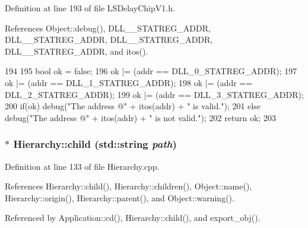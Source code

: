 Definition at line 193 of file LSDelayChipV1.h.

References Object::debug(), DLL\_\_\-STATREG\_\-ADDR, DLL\_\_\-STATREG\_\-ADDR, DLL\_\_\-STATREG\_\-ADDR, DLL\_\_\-STATREG\_\-ADDR, and itos().


\begin{DoxyCode}
194     {
195          bool ok = false;  
196          ok |= (addr == DLL_0_STATREG_ADDR); 
197          ok |= (addr == DLL_1_STATREG_ADDR);
198          ok |= (addr == DLL_2_STATREG_ADDR);
199          ok |= (addr == DLL_3_STATREG_ADDR);  
200          if(ok) debug("The address @" + itos(addr) + " is valid.");
201          else   debug("The address @" + itos(addr) + " is not valid.");      
202          return ok;           
203     }
\end{DoxyCode}
\hypertarget{classHierarchy_a1e207f973c694b538bf90107b4868817}{
\subsubsection[{child}]{ $\ast$ Hierarchy::child (std::string {\em path})}}
\label{classHierarchy_a1e207f973c694b538bf90107b4868817}


Definition at line 133 of file Hierarchy.cpp.

References Hierarchy::child(), Hierarchy::children(), Object::name(), Hierarchy::origin(), Hierarchy::parent(), and Object::warning().

Referenced by Application::cd(), Hierarchy::child(), and export\_\-obj().


